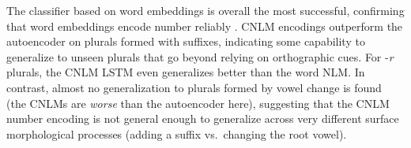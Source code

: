 

The classifier based on word embeddings is overall the most
successful, confirming that word embeddings encode number reliably
\cite{Mikolov:etal:2013a}.  CNLM encodings outperform the autoencoder
on plurals formed with suffixes, indicating some capability to
generalize to unseen plurals that go beyond relying on orthographic
cues.  For -\emph{r} plurals, the CNLM LSTM even generalizes better
than the word NLM.  In contrast, almost no generalization to plurals
formed by vowel change is found (the CNLMs are \emph{worse} than the
autoencoder here), suggesting that the CNLM number encoding is not
general enough to generalize across very different surface
morphological processes (adding a suffix vs.~changing the root vowel).
